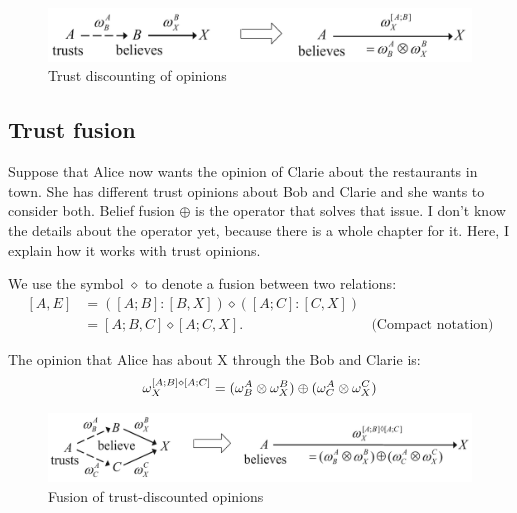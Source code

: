 \documentclass[a4paper,12pt]{article}
\theoremstyle{definition}
\numberwithin{equation}{section}
\begin{document}
\begin{figure}[htb]
	\centering
	\includegraphics[scale=0.3]{images/trust-discounting-of-opinions.png}
	\caption{Trust discounting of opinions}
\end{figure}

\subsection{Trust fusion}

Suppose that Alice now wants the opinion of Clarie about the restaurants in town. She has different trust opinions about Bob and Clarie and she wants to consider both. Belief fusion $\oplus$ is the operator that solves that issue. I don't know the details about the operator yet, because there is a whole chapter for it. Here, I explain how it works with trust opinions.

We use the symbol $\diamond$ to denote a fusion between two relations:
\begin{equation}
	\begin{array}{rll}
		[A,E] & = ([A; B] : [B, X]) \diamond([A; C] : [C, X]) \\
		& = [A; B, C] \diamond [A; C, X] \text{.} & \text{(Compact notation)} 
	\end{array}
\end{equation}

The opinion that Alice has about X through the Bob and Clarie is:
\begin{equation}
	\omega^{[A; B] \diamond [A; C]}_{X} = (\omega^{A}_{B} \otimes \omega^{B}_{X}) \oplus (\omega^{A}_{C} \otimes \omega^{C}_{X})
\end{equation}

\begin{figure}[htb]
	\centering
	\includegraphics[scale=0.32]{images/fusion-of-trust-discounted-opinions.png}
	\caption{Fusion of trust-discounted opinions}
\end{figure}

%
%	
%	
\end{document}
